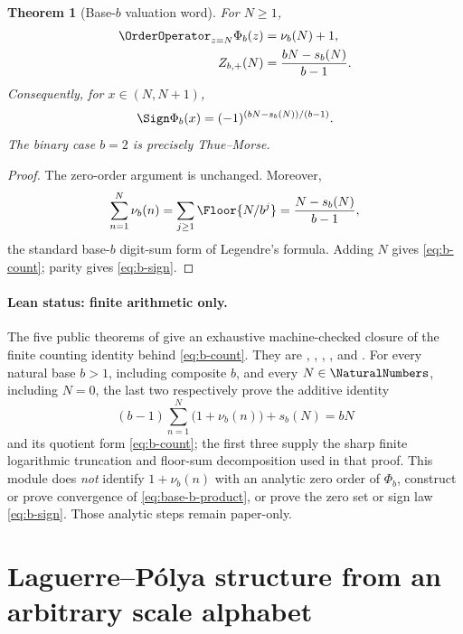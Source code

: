 \documentclass[11pt]{article}
\numberwithin{equation}{section}
\newtheorem{theorem}{Theorem}[section]
\theoremstyle{definition}
\theoremstyle{remark}
\begin{document}
\begin{theorem}[Base-$b$ valuation word]\label{thm:base-b}
For $N\ge1$,
\begin{align}
 \OrderOperator_{z=N}\Phi_b(z)&=\nu_b(N)+1,\label{eq:b-order}\\
 Z_{b,+}(N)&=\frac{bN-s_b(N)}{b-1}.
 \label{eq:b-count}
\end{align}
Consequently, for $x\in(N,N+1)$,
\begin{equation}\label{eq:b-sign}
 \Sign\Phi_b(x)=(-1)^{(bN-s_b(N))/(b-1)}.
\end{equation}
The binary case $b=2$ is precisely Thue--Morse.
\end{theorem}
\begin{proof}
The zero-order argument is unchanged.  Moreover,
\[
 \sum_{n=1}^{N}\nu_b(n)=\sum_{j\ge1}\Floor{N/b^j}
 =\frac{N-s_b(N)}{b-1},
\]
the standard base-$b$ digit-sum form of Legendre's formula.  Adding $N$ gives \eqref{eq:b-count}; parity gives \eqref{eq:b-sign}.
\end{proof}

\paragraph{Lean status: finite arithmetic only.}
The five public theorems of  give an
exhaustive machine-checked closure of the finite counting identity behind
\eqref{eq:b-count}.  They are
,
,
,
, and
.  For every natural
base \(b>1\), including composite \(b\), and every \(N\in\NaturalNumbers\), including
\(N=0\), the last two respectively prove the additive identity
\[
 (b-1)\sum_{n=1}^{N}\bigl(1+\nu_b(n)\bigr)+s_b(N)=bN
\]
and its quotient form \eqref{eq:b-count}; the first three supply the sharp
finite logarithmic truncation and floor-sum decomposition used in that proof.
This module does \emph{not} identify \(1+\nu_b(n)\) with an analytic zero
order of \(\Phi_b\), construct or prove convergence of
\eqref{eq:base-b-product}, or prove the zero set or sign law
\eqref{eq:b-sign}.  Those analytic steps remain paper-only.

\section{Laguerre--Pólya structure from an arbitrary scale alphabet}\label{sec:LP}
\end{document}
